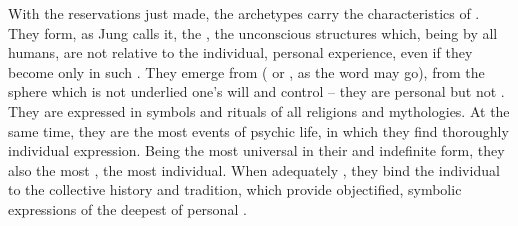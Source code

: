 \label{sub:invArch}

\pa With the reservations just made, the archetypes carry the characteristics of
. They form, as Jung calls it, the ,
the unconscious structures which, being  by all humans, are not
relative to the individual, personal experience, even if they become
 only in such .  They emerge from 
( or , as the word may go), from the sphere which is
not underlied one's will and control -- they are personal but not
.  They are expressed in symbols and rituals of all religions and
mythologies. At the same time, they are the most 
events of psychic life, in which they find thoroughly individual expression.
Being the most universal in their  and indefinite form, they also
 the most , the most individual. When adequately
, they bind the individual to the collective history and
tradition, which provide objectified, symbolic expressions of the deepest
 of personal .



